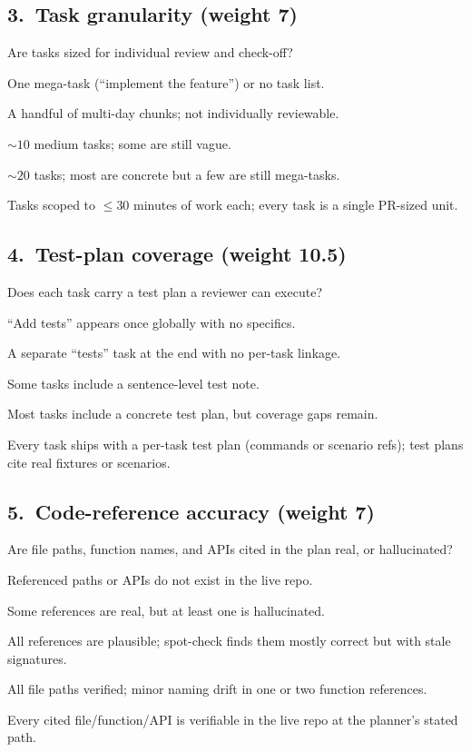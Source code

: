 \subsection*{3.\ Task granularity (weight 7)}
Are tasks sized for individual review and check-off?
\begin{description}[leftmargin=11mm, labelindent=0mm]
\item[1] One mega-task (``implement the feature'') or no task list.
\item[2] A handful of multi-day chunks; not individually reviewable.
\item[3] $\sim 10$ medium tasks; some are still vague.
\item[4] $\sim 20$ tasks; most are concrete but a few are still mega-tasks.
\item[5] Tasks scoped to $\le 30$ minutes of work each; every task is a single PR-sized unit.
\end{description}

\subsection*{4.\ Test-plan coverage (weight 10.5)}
Does each task carry a test plan a reviewer can execute?
\begin{description}[leftmargin=11mm, labelindent=0mm]
\item[1] ``Add tests'' appears once globally with no specifics.
\item[2] A separate ``tests'' task at the end with no per-task linkage.
\item[3] Some tasks include a sentence-level test note.
\item[4] Most tasks include a concrete test plan, but coverage gaps remain.
\item[5] Every task ships with a per-task test plan (commands or scenario refs); test plans cite real fixtures or scenarios.
\end{description}

\subsection*{5.\ Code-reference accuracy (weight 7)}
Are file paths, function names, and APIs cited in the plan real, or hallucinated?
\begin{description}[leftmargin=11mm, labelindent=0mm]
\item[1] Referenced paths or APIs do not exist in the live repo.
\item[2] Some references are real, but at least one is hallucinated.
\item[3] All references are plausible; spot-check finds them mostly correct but with stale signatures.
\item[4] All file paths verified; minor naming drift in one or two function references.
\item[5] Every cited file/function/API is verifiable in the live repo at the planner's stated path.
\end{description}

